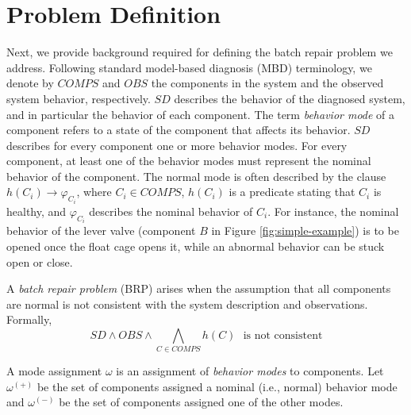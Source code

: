 \documentclass[review]{elsarticle}
\newcommand{\COMPS}{\textit{COMPS}}
\newcommand{\SD}{\textit{SD}}
\newcommand{\OBS}{\textit{OBS}}
\begin{document}
\section{Problem Definition}
Next, we provide background required for defining the batch repair problem we address. %
Following standard model-based diagnosis (MBD) terminology, we denote by $\COMPS$ and $\OBS$ the components in the system and the observed system behavior, respectively. $\SD$ describes the behavior of the diagnosed system, and in particular the behavior of each component. The term {\em behavior mode} of a component refers to a state of the component that affects its behavior. $\SD$ describes for every component one or more behavior modes. For every component, at least one of the behavior modes must represent the nominal behavior of the component. The normal mode is often described by the clause $h(C_i) \rightarrow \varphi_{C_i}$, where $C_i\in \COMPS$, $h(C_i)$ is a predicate stating that $C_i$ is healthy, and $\varphi_{C_i}$ describes the nominal behavior of $C_i$. For instance, the nominal behavior of the lever valve (component $B$ in Figure \ref{fig:simple-example}) is to be opened once the float cage opens it, while an abnormal behavior can be stuck open or close.

A {\em batch repair problem} (BRP) arises when the assumption that all components are normal is not consistent with the system description and observations. Formally,
\[ \SD \wedge \OBS \wedge \bigwedge_{C\in \COMPS} h(C) ~~~ \text{is not consistent} \]

A mode assignment $\omega$ is an assignment of {\em behavior modes} to components. Let $\omega^{(+)}$ be the set of components assigned a nominal (i.e., normal) behavior mode and $\omega^{(-)}$ be the set of components assigned one of the other modes.


\end{document}
